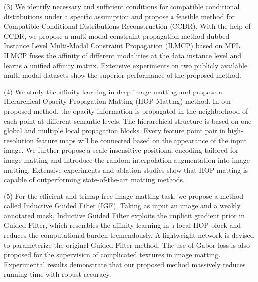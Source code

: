 \begin{enabstract}
  (3) We identify necessary and sufficient conditions for compatible conditional distributions under a specific assumption and propose a feasible method for Compatible Conditional Distributions Reconstruction (CCDR). With the help of CCDR, we propose a multi-modal constraint propagation method dubbed Instance Level Multi-Modal Constraint Propagation (ILMCP) based on MFL. ILMCP fuses the affinity of different modalities at the data instance level and learns a unified affinity matrix. Extensive experiments on two publicly available multi-modal datasets show the superior performance of the proposed method. 

  (4) We study the affinity learning in deep image matting and propose a Hierarchical Opacity Propagation Matting (HOP Matting) method. In our proposed method, the opacity information is propagated in the neighborhood of each point at different semantic levels. The hierarchical structure is based on one global and multiple local propagation blocks. Every feature point pair in high-resolution feature maps will be connected based on the appearance of the input image. We further propose a scale-insensitive positional encoding tailored for image matting and introduce the random interpolation augmentation into image matting. Extensive experiments and ablation studies show that HOP matting is capable of outperforming state-of-the-art matting methods.

  (5) For the efficient and trimap-free image matting task, we propose a method called Inductive Guided Filter (IGF). Taking as input an image and a weakly annotated mask, Inductive Guided Filter exploits the implicit gradient prior in Guided Filter, which resembles the affinity learning in a local HOP block and reduces the computational burden tremendously. A lightweight network is devised to parameterize the original Guided Filter method. The use of Gabor loss is also proposed for the supervision of complicated textures in image matting.
  Experimental results demonstrate that our proposed method massively reduces running time with robust accuracy.




\end{enabstract}
